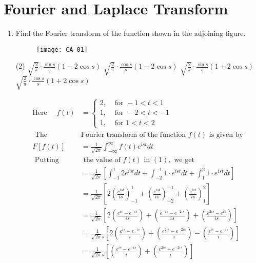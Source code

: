 \chapter{Fourier and Laplace Transform}
\begin{enumerate}
\item Find the Fourier transform of the function shown in the adjoining figure.
\begin{figure}[H]
	\centering
	\texttt{[image: CA-01]}
\end{figure}
\begin{tasks}(2)
	\task[\textbf{a.}]$\sqrt{\frac{2}{\pi}} \cdot \frac{\sin s}{s}(1-2 \cos s)$
	\task[\textbf{b.}]$\sqrt{\frac{2}{\pi}} \cdot \frac{\cos s}{s}(1-2 \cos s)$
	\task[\textbf{c.}]$\sqrt{\frac{2}{\pi}} \cdot \frac{\sin s}{s}(1+2 \cos s)$
	\task[\textbf{d.}] $\sqrt{\frac{2}{\pi}} \cdot \frac{\cos s}{s}(1+2 \cos s)$
\end{tasks}
\begin{answer}
	$$
	\begin{aligned}
	\text{Here }\quad f(t)&= \begin{cases}2, & \text { for }-1<t<1 \\ 1, & \text { for }-2<t<-1 \\ 1, & \text { for } 1<t<2\end{cases}\\
	\text { The  }&\text{Fourier transform of the function } f(t) \text { is given by }\\
	F[f(t)]&=\frac{1}{\sqrt{2 \pi}} \int_{-\infty}^{\infty} f(t) e^{i s t} d t\\
	\text { Putting} &\text{ the value of }f(t) \text { in }(1), \text { we get }\\
	&=\frac{1}{\sqrt{2 \pi}}\left[\int_{-1}^{1} 2 e^{i s t} d t+\int_{-2}^{-1} 1 \cdot e^{i s t} d t+\int_{1}^{2} 1 \cdot e^{i s t} d t\right]\\
	&=\frac{1}{\sqrt{2 \pi}}\left[2\left(\frac{e^{i s t}}{i s}\right)_{-1}^{1}+\left(\frac{e^{i s t}}{i s}\right)_{-2}^{-1}+\left(\frac{e^{i s t}}{i s}\right)_{1}^{2}\right] \\
	&=\frac{1}{\sqrt{2 \pi}}\left[2\left(\frac{e^{i s}-e^{-i s}}{i s}\right)+\left(\frac{e^{-i s}-e^{-2 i s}}{i s}\right)+\left(\frac{e^{2 i s}-e^{i s}}{i s}\right)\right] \\
	&=\frac{1}{\sqrt{2 \pi }s}\left[2\left(\frac{e^{i s}-e^{-i s}}{i}\right)+\left(\frac{e^{2 i s}-e^{-2 i s}}{i}\right)-\left(\frac{e^{i s}-e^{-i s}}{i}\right)\right]\\&=\frac{1}{\sqrt{2 \pi }s}\left[\left(\frac{e^{i s}-e^{-i s}}{i}\right)+\left(\frac{e^{2 i s}-e^{-2 i s}}{i}\right)\right]\\

\end{aligned}$$
\end{answer}
\end{enumerate}
